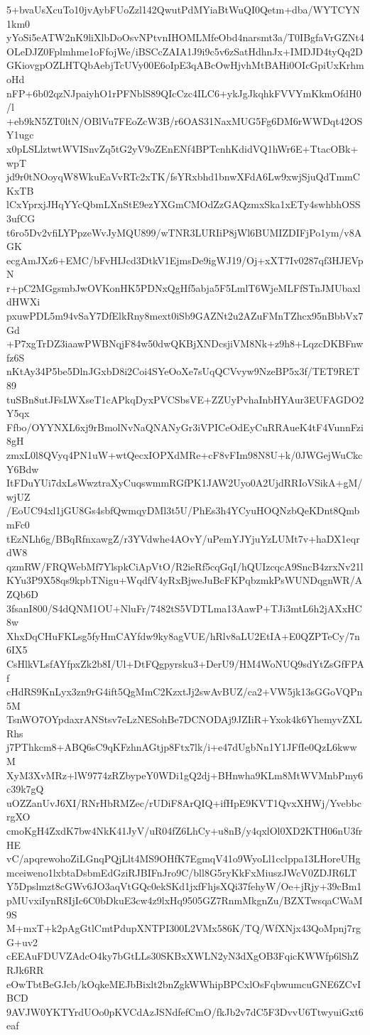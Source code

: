 5+bvaUsXcuTo10jvAybFUoZzl142QwutPdMYiaBtWuQI0Qetm+dba/WYTCYN1km0
yYoSi5eATW2nK9liXlbDoOsvNPtvnIHOMLMfeObd4narsmt3a/T0IBgfaVrGZNt4
OLeDJZ0Fplmhme1oFfojWe/iBSCcZAIA1J9i9c5v6zSatHdhnJx+IMDJD4tyQq2D
GKiovgpOZLHTQbAebjTcUVy00E6oIpE3qABcOwHjvhMtBAHi0OIcGpiUxKrhmoHd
nFP+6b02qzNJpaiyhO1rPFNblS89QIcCzc4ILC6+ykJgJkqhkFVVYmKkmOfdH0/l
+eb9kN5ZT0ltN/OBlVu7FEoZcW3B/r6OAS31NaxMUG5Fg6DM6rWWDqt42OSY1ugc
x0pLSLlztwtWVISnvZq5tG2yV9oZEnENf4BPTcnhKdidVQ1hWr6E+TtacOBk+wpT
jd9r0tNOoyqW8WkuEaVvRTc2xTK/fsYRxbhd1bnwXFdA6Lw9xwjSjuQdTmmCKxTB
lCxYprxjJHqYYcQbmLXnStE9ezYXGmCMOdZzGAQzmxSka1xETy4swhbhOSS3ufCG
t6ro5Dv2vfiLYPpzeWvJyMQU899/wTNR3LURIiP8jWl6BUMIZDIFjPo1ym/v8AGK
ecgAmJXz6+EMC/bFvHIJcd3DtkV1EjmsDe9igWJ19/Oj+xXT7Iv0287qf3HJEVpN
r+pC2MGgsmbJwOVKonHK5PDNxQgHf5abja5F5LmlT6WjeMLFfSTnJMUbaxldHWXi
pxuwPDL5m94vSaY7DfElkRny8mext0iSb9GAZNt2u2AZuFMnTZhcx95nBbbVx7Gd
+P7xgTrDZ3iaawPWBNqjF84w50dwQKBjXNDcsjiVM8Nk+z9h8+LqzcDKBFnwfz6S
nKtAy34P5be5DlnJGxbD8i2Coi4SYeOoXe7sUqQCVvyw9NzeBP5x3f/TET9RET89
tuSBn8utJFsLWXseT1cAPkqDyxPVCSbsVE+ZZUyPvhaInbHYAur3EUFAGDO2Y5qx
Ffbo/OYYNXL6xj9rBmolNvNaQNANyGr3iVPICeOdEyCuRRAueK4tF4VunnFzi8gH
zmxL0l8QVyq4PN1uW+wtQecxIOPXdMRe+cF8vFIm98N8U+k/0JWGejWuCkcY6Bdw
ItFDuYUi7dxLsWwztraXyCuqswmmRGfPK1JAW2Uyo0A2UjdRRIoVSikA+gM/wjUZ
/EoUC94xl1jGU8Gs4sbfQwmqyDMl3t5U/PhEs3h4YCyuHOQNzbQeKDnt8QmbmFc0
tEzNLh6g/BBqRfnxawgZ/r3YVdwhe4AOvY/uPemYJYjuYzLUMt7v+haDX1eqrdW8
qzmRW/FRQWebMf7YlspkCiApVtO/R2ieRf5cqGqI/hQUIzcqcA9SncB4zrxNv21l
KYu3P9X58qs9kpbTNigu+WqdfV4yRxBjweJuBcFKPqbzmkPsWUNDqgnWR/AZQb6D
3fsanI800/S4dQNM1OU+NluFr/7482tS5VDTLma13AawP+TJi3mtL6h2jAXxHC8w
XhxDqCHuFKLsg5fyHmCAYfdw9ky8agVUE/hRlv8aLU2EtIA+E0QZPTeCy/7n6IX5
CsHlkVLsfAYfpxZk2b8I/Ul+DtFQgpyrsku3+DerU9/HM4WoNUQ9sdYtZsGfFPAf
cHdRS9KnLyx3zn9rG4ift5QgMmC2KzxtJj2swAvBUZ/ca2+VW5jk13sGGoVQPn5M
TsnWO7OYpdaxrANStsv7eLzNESohBe7DCNODAj9JZIiR+Yxok4k6YhemyvZXLRhs
j7PThkcm8+ABQ6sC9qKFzhnAGtjp8Ftx7lk/i+e47dUgbNn1Y1JFfIe0QzL6kwwM
XyM3XvMRz+lW9774zRZbypeY0WDi1gQ2dj+BHnwha9KLm8MtWVMnbPmy6c39k7gQ
uOZZanUvJ6XI/RNrHbRMZec/rUDiF8ArQIQ+ifHpE9KVT1QvxXHWj/YvebbcrgXO
cmoKgH4ZxdK7bw4NkK41JyV/uR04fZ6LhCy+u8nB/y4qxlOl0XD2KTH06nU3frHE
vC/apqrewohoZiLGnqPQjLlt4MS9OHfK7EgmqV41o9WyoLl1cclppa13LHoreUHg
mceiweno1lxbtaDsbmEdGziRJBIFnJro9C/bll8G5ryKkFxMiuszJWcV0ZDJR6LT
Y5Dpslmzt8cGWv6JO3aqVtGQc0ekSKd1jxfFhjsXQi37fehyW/Oe+jRjy+39cBm1
pMUvxiIynR8IjIc6C0bDkuE3cw4z9lxHq9505GZ7RnmMkgnZu/BZXTwsqaCWaM9S
M+mxT+k2pAgGtlCmtPdupXNTPI300L2VMx586K/TQ/WfXNjx43QoMpnj7rgG+uv2
cEEAuFDUVZAdcO4ky7bGtLLs30SKBxXWLN2yN3dXgOB3FqicKWWfp6lShZRJk6RR
eOwTbtBeGJcb/kOqkeMEJbBixlt2bnZgkWWhipBPCxlOsFqbwumcuGNE6ZCvIBCD
9AVJW0YKTYrdUOo0pKVCdAzJSNdfefCmO/fkJb2v7dC5F3DvvU6TtwyuiGxt6eaf
